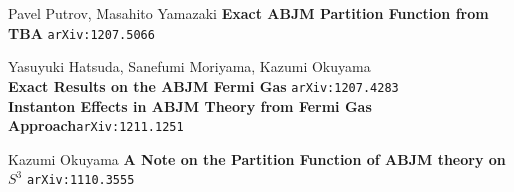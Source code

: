 \documentclass[12pt]{article}
\begin{document}
\begin{thebibliography}{}

\item Pavel Putrov, Masahito Yamazaki \textbf{Exact ABJM Partition Function from TBA} \hfill \texttt{arXiv:1207.5066}

\item Yasuyuki Hatsuda, Sanefumi Moriyama, Kazumi Okuyama \\ \textbf{Exact Results on the ABJM Fermi Gas} \hfill \texttt{arXiv:1207.4283} \\ 
\textbf{Instanton Effects in ABJM Theory from Fermi Gas Approach}\hfill \texttt{arXiv:1211.1251}

\item  Kazumi Okuyama \textbf{A Note on the Partition Function of ABJM theory on $S^3$} \hfill \texttt{arXiv:1110.3555}

\end{thebibliography}
\end{document}
